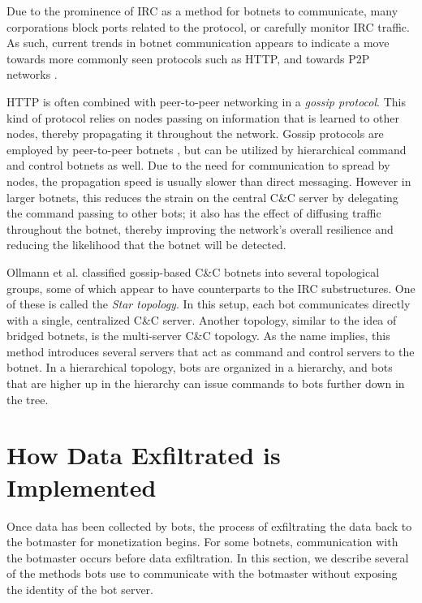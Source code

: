 \documentclass{acm_proc_article-sp}
\begin{document}
Due to the prominence of IRC as a method for botnets to communicate, many corporations block ports related to the protocol, or carefully monitor IRC traffic. As such, current trends in botnet communication appears to indicate a move towards more commonly seen protocols such as HTTP, and towards P2P networks \cite{cooke:survey}.


HTTP is often combined with peer-to-peer networking in a \emph{gossip protocol}. This kind of protocol relies on nodes passing on information that is learned to other nodes, thereby propagating it throughout the network. Gossip protocols are employed by peer-to-peer botnets \cite{defcon:prowling}, but can be utilized by hierarchical command and control botnets as well. Due to the need for communication to spread by nodes, the propagation speed is usually slower than direct messaging. However in larger botnets, this reduces the strain on the central C\&C server by delegating the command passing to other bots; it also has the effect of diffusing traffic throughout the botnet, thereby improving the network's overall resilience and reducing the likelihood that the botnet will be detected.

Ollmann et al. classified gossip-based C\&C botnets into several topological groups\cite{ollmann:topology}, some of which appear to have counterparts to the IRC substructures. One of these is called the \emph{Star topology}. In this setup, each bot communicates directly with a single, centralized C\&C server. Another topology, similar to the idea of bridged botnets, is the multi-server C\&C topology. As the name implies, this method introduces several servers that act as command and control servers to the botnet. In a hierarchical topology, bots are organized in a hierarchy, and bots that are higher up in the hierarchy can issue commands to bots further down in the tree.

\section{How Data Exfiltrated is Implemented}

Once data has been collected by bots, the process of exfiltrating the data back to the botmaster for monetization begins.  For some botnets, communication with the botmaster occurs before data exfiltration.  In this section, we describe several of the methods bots use to communicate with the botmaster without exposing the identity of the bot server.
\end{document}
